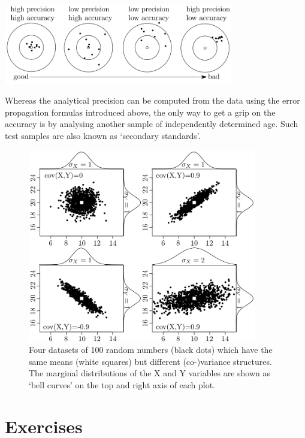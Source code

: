 \documentclass{book}
\newif\ifpdf
\begin{document}
\noindent
\begin{minipage}{\textwidth}
  \centering
  \ifpdf
  \def\svgwidth{\textwidth}
  
  \else
  \includegraphics[width=10cm]{bullseye.png}
  \fi
\end{minipage}

\bigskip

Whereas the analytical precision can be computed from the data using
the error propagation formulas introduced above, the only way to get a
grip on the accuracy is by analysing another sample of independently
determined age. Such test samples are also known as `secondary
standards'.

\begin{figure}[!ht]
  \centering
  \ifpdf
  \def\svgwidth{\textwidth}
  
  \else
  \includegraphics[width=10cm]{covariance.png}
  \fi
  \caption{Four datasets of 100 random numbers (black dots) which have
    the same means (white squares) but different (co-)variance
    structures. The marginal distributions of the X and Y variables
    are shown as `bell curves' on the top and right axis of each
    plot.}
  \label{fig:covariance}
\end{figure}

\chapter{Exercises}
\label{sec:exercises}
\end{document}
